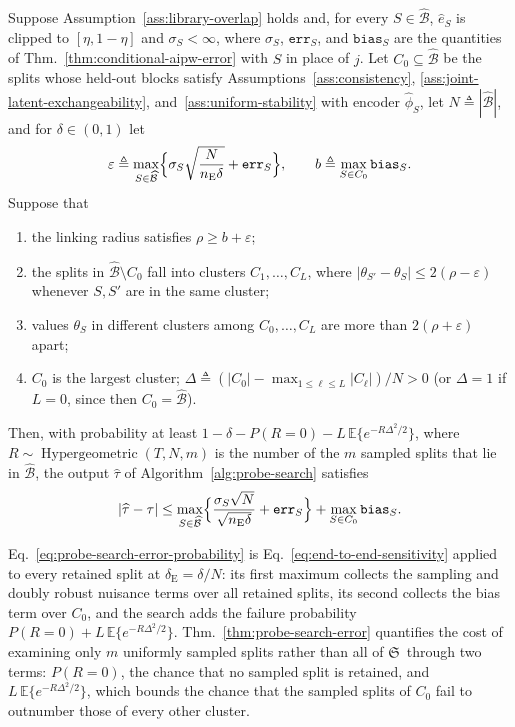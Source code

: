 \begin{theorem}
\label{thm:probe-search-error}
\normalfont
Suppose Assumption~\ref{ass:library-overlap} holds and, for every $S\in\widehat{\mathcal B}$, $\widehat e_S$ is clipped to $[\eta,1-\eta]$ and $\sigma_S<\infty$, where $\sigma_S$, $\mathtt{err}_S$, and $\mathtt{bias}_S$ are the quantities of Thm.~\ref{thm:conditional-aipw-error} with $S$ in place of $j$. Let $C_0\subseteq\widehat{\mathcal B}$ be the splits whose held-out blocks satisfy Assumptions~\ref{ass:consistency}, \ref{ass:joint-latent-exchangeability}, and~\ref{ass:uniform-stability} with encoder $\widehat\phi_S$, let $N\triangleq|\widehat{\mathcal B}|$, and for $\delta\in(0,1)$ let
\[\varepsilon\triangleq\max_{S\in\widehat{\mathcal B}}\Bigl\{\sigma_S\sqrt{\frac{N}{n_{\mathrm E}\delta}}+\mathtt{err}_S\Bigr\},\qquad b\triangleq\max_{S\in C_0}\mathtt{bias}_S.\]
Suppose that
\begin{enumerate}[label=(\roman*),leftmargin=*,itemsep=0pt,topsep=2pt]
	\item the linking radius satisfies $\rho\ge b+\varepsilon$;
	\item the splits in $\widehat{\mathcal B} \setminus C_0$ fall into clusters $C_1,\ldots,C_L$, where $|\theta_{S'} - \theta_S| \leq 2(\rho-\varepsilon)$ whenever $S,S'$ are in the same cluster;
	\item values $\theta_S$ in different clusters among $C_0,\ldots,C_L$ are more than $2(\rho+\varepsilon)$ apart;
	\item $C_0$ is the largest cluster; $\Delta\triangleq(|C_0|-\max_{1\le\ell\le L}|C_\ell|)/N>0$ (or $\Delta=1$ if $L=0$, since then $C_0=\widehat{\mathcal B}$).
\end{enumerate}
Then, with probability at least $1-\delta-P(R=0)-L\,\mathbb E\{e^{-R\Delta^2/2}\}$, where $R\sim\operatorname{Hypergeometric}(T,N,m)$ is the number of the $m$ sampled splits that lie in $\widehat{\mathcal B}$, the output $\widehat\tau$ of Algorithm~\ref{alg:probe-search} satisfies
\begin{align}
|\widehat\tau-\tau|\le\max_{S\in\widehat{\mathcal B}}\Bigl\{\frac{\sigma_S\sqrt N}{\sqrt{n_{\mathrm E}\delta}}+\mathtt{err}_S\Bigr\}+\max_{S\in C_0}\mathtt{bias}_S.
\label{eq:probe-search-error-probability}
\end{align}
\end{theorem}

Eq.~\eqref{eq:probe-search-error-probability} is Eq.~\eqref{eq:end-to-end-sensitivity} applied to every retained split at $\delta_{\mathrm E}=\delta/N$: its first maximum collects the sampling and doubly robust nuisance terms over all retained splits, its second collects the bias term over $C_0$, and the search adds the failure probability $P(R=0)+L\,\mathbb E\{e^{-R\Delta^2/2}\}$. Thm.~\ref{thm:probe-search-error} quantifies the cost of examining only $m$ uniformly sampled splits rather than all of $\mathfrak S$~through two terms: $P(R=0)$, the chance that no sampled split is retained, and $L\,\mathbb E\{e^{-R\Delta^2/2}\}$, which bounds the chance that the sampled splits of $C_0$ fail to outnumber those of every other cluster.
